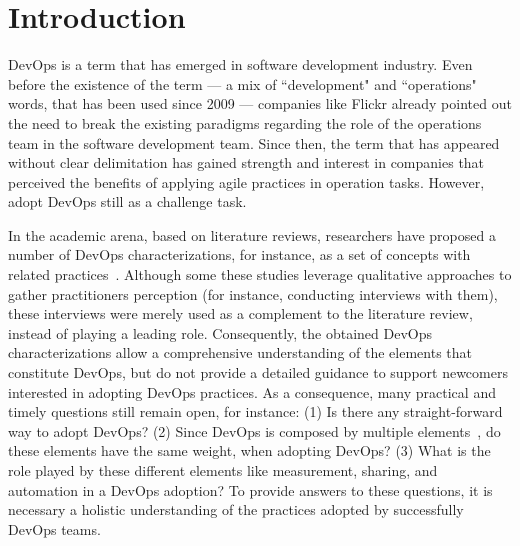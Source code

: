 \section{Introduction}

DevOps is a term that has emerged in software development industry. Even before
the existence of the term --- a mix of ``development" and ``operations" words, that
has been used since 2009 --- companies like Flickr \cite{flickr} already
pointed out the need to break the existing paradigms regarding the role of the
operations team in the software development team. Since then, the term that has appeared
without clear delimitation has gained strength and interest in companies that
perceived the benefits of applying agile practices in operation tasks.
However, adopt DevOps still as a challenge task.

In the academic arena, based on literature reviews, researchers have proposed a number of DevOps characterizations, for instance, as a set of concepts with related practices~\cite{cooperation_dev_ops_esem_2014,devops_a_definition_xp_15,dimensions_of_devops_xp_15,extending_dimensions_icsea_16,characterizing_devops_sbes_2016,qualitative_devops_journalsw_17}. Although some these studies leverage qualitative approaches to gather practitioners perception (for instance, conducting interviews with them), these interviews were merely used as a complement to the literature review, instead of playing a leading role. Consequently, the obtained DevOps characterizations allow a comprehensive understanding of the elements that constitute DevOps, but do not provide a detailed guidance to support newcomers interested in adopting DevOps practices.
As a consequence, many practical and timely questions still remain open, for instance: (1) Is there any straight-forward way to adopt DevOps? (2) Since DevOps is composed by multiple elements~\cite{dimensions_of_devops_xp_15}, do these elements have the same weight, when adopting DevOps?
(3) What is the role played by these different elements like measurement, sharing, and automation in a DevOps adoption? To provide answers to these questions, it is necessary a holistic understanding of the practices adopted by successfully DevOps teams.

